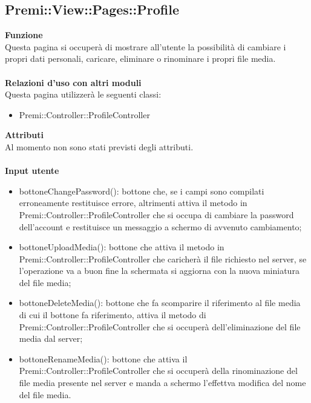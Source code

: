{					\subsection{Premi::View::Pages::Profile}{
						\textbf{Funzione}\\
						\indent Questa pagina si occuperà di mostrare all'utente la possibilità di cambiare i propri dati personali, caricare, eliminare o rinominare i propri file media.\\\\
						\textbf{Relazioni d'uso con altri moduli}\\
						\indent Questa pagina utilizzerà le seguenti classi:
						\begin{itemize}
							\item Premi::Controller::ProfileController
						\end{itemize}
						\textbf{Attributi}\\
						\indent Al momento non sono stati previsti degli attributi.\\\\
						\textbf{Input utente}
						\begin{itemize}
							\item bottoneChangePassword(): bottone che, se i campi sono compilati erroneamente restituisce errore, altrimenti attiva il metodo in Premi::Controller::ProfileController che si occupa di cambiare la password dell'account e restituisce un messaggio a schermo di avvenuto cambiamento;
							\item bottoneUploadMedia(): bottone che attiva il metodo in Premi::Controller::ProfileController che caricherà il file richiesto nel server, se l'operazione va a buon fine la schermata si aggiorna con la nuova miniatura del file media;
							\item bottoneDeleteMedia(): bottone che fa scomparire il riferimento al file media di cui il bottone fa riferimento, attiva il metodo di Premi::Controller::ProfileController che si occuperà dell'eliminazione del file media dal server;
							\item bottoneRenameMedia(): bottone che attiva il Premi::Controller::ProfileController che si occuperà della rinominazione del file media presente nel server e manda a schermo l'effettva modifica del nome del file media.
						\end{itemize}
					}
}
